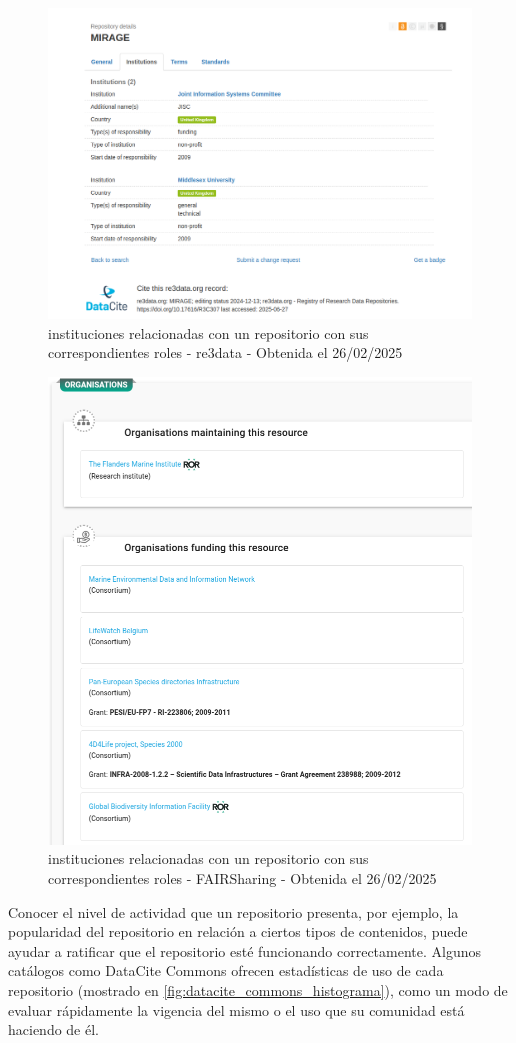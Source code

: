 \documentclass[runningheads]{llncs}
\begin{document}
\begin{figure}
    \centering
    \includegraphics[width=0.5\linewidth]{img/re3data_institutions.png}
    \caption{instituciones relacionadas con un repositorio con sus correspondientes roles - re3data - Obtenida el 26/02/2025}
    \label{fig:re3data_institutions}
\end{figure}

\begin{figure}
    \centering
    \includegraphics[width=0.5\linewidth]{img/fairsharing_institutions.png}
    \caption{instituciones relacionadas con un repositorio con sus correspondientes roles - FAIRSharing - Obtenida el 26/02/2025}
    \label{fig:fairsharing_institutions}
\end{figure}

Conocer el nivel de actividad que un repositorio presenta,  por ejemplo, la popularidad del repositorio en relación a ciertos tipos de contenidos, puede ayudar a ratificar que el repositorio esté funcionando correctamente. Algunos catálogos como DataCite Commons ofrecen estadísticas de uso de cada repositorio (mostrado en \ref{fig:datacite_commons_histograma}), como un modo de evaluar rápidamente la vigencia del mismo o el uso que su comunidad está haciendo de él.\\
\end{document}
